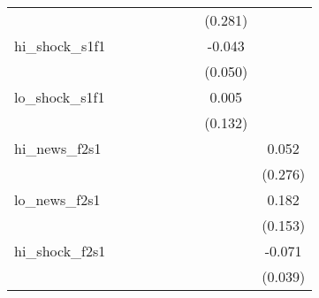 {\begin{tabular}{l*{8}{c}}
            &                     &                     &                     &                     &                     &                     &     (0.281)         &                     \\
\addlinespace
hi\_shock\_s1f1&                     &                     &                     &                     &                     &                     &      -0.043         &                     \\
            &                     &                     &                     &                     &                     &                     &     (0.050)         &                     \\
\addlinespace
lo\_shock\_s1f1&                     &                     &                     &                     &                     &                     &       0.005         &                     \\
            &                     &                     &                     &                     &                     &                     &     (0.132)         &                     \\
\addlinespace
hi\_news\_f2s1&                     &                     &                     &                     &                     &                     &                     &       0.052         \\
            &                     &                     &                     &                     &                     &                     &                     &     (0.276)         \\
\addlinespace
lo\_news\_f2s1&                     &                     &                     &                     &                     &                     &                     &       0.182         \\
            &                     &                     &                     &                     &                     &                     &                     &     (0.153)         \\
\addlinespace
hi\_shock\_f2s1&                     &                     &                     &                     &                     &                     &                     &      -0.071\sym{*}  \\
            &                     &                     &                     &                     &                     &                     &                     &     (0.039)         \\

\end{tabular}}
